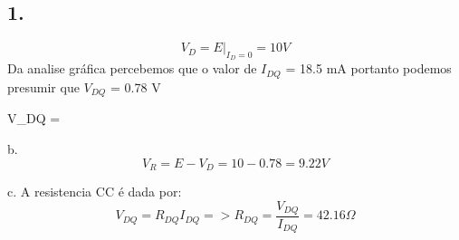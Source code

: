\subsection{1.}


        $$
        V_D = \left. E \right|_{I_D = 0} = 10 V
        $$
        Da analise gráfica percebemos que o valor de $I_{DQ}$ = 18.5 mA portanto
        podemos presumir que $V_{DQ}$ = 0.78 V



        V_{DQ} =
    \item b.
        $$
        V_R = E - V_D = 10 - 0.78 = 9.22 V
        $$
    \item c.
        A resistencia CC é dada por:
          $$
          V_{DQ} = R_{DQ}I_{DQ} => R_{DQ} = \frac{V_{DQ}}{I_{DQ}} = 42.16 \Omega
          $$
